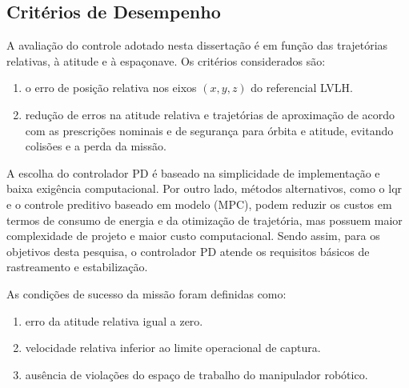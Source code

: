 \subsection{Critérios de Desempenho}
\label{sec:criterios_desempenho}

A avaliação do controle adotado nesta dissertação é em função das trajetórias relativas, à atitude e à espaçonave.
Os critérios considerados são:
\begin{enumerate}[label=(\roman*)]
  \item o erro de posição relativa nos eixos $(x,y,z)$ do referencial LVLH.
  \item redução de erros na atitude relativa e trajetórias de aproximação de acordo com as prescrições nominais e de segurança para órbita e atitude, evitando colisões e a perda da missão.
\end{enumerate}

A escolha do controlador PD é baseado na simplicidade de implementação e baixa exigência computacional.
Por outro lado, métodos alternativos, como o \gls{lqr} e o controle preditivo baseado em modelo (MPC), podem reduzir os custos em termos de consumo de energia e da otimização de trajetória, mas possuem maior complexidade de projeto e maior custo computacional.
Sendo assim, para os objetivos desta pesquisa, o controlador PD atende os requisitos básicos de rastreamento e estabilização.

As condições de sucesso da missão foram definidas como:  
\begin{enumerate}[label=(\roman*)]
  \item erro da atitude relativa igual a zero.
  \item velocidade relativa inferior ao limite operacional de captura.
  \item ausência de violações do espaço de trabalho do manipulador robótico.
\end{enumerate}
